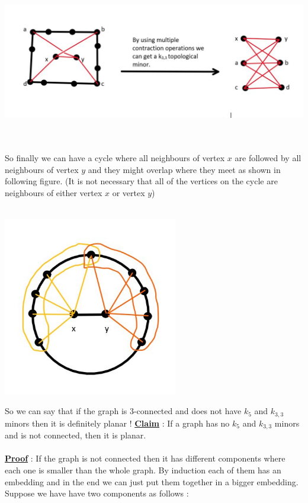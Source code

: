 \documentclass{article}
\begin{document}
    \\\\
    \centerline{\includegraphics[width=6in]{Images/k3,3.jpg}}
    \\\\
    So finally we can have a cycle where all neighbours of vertex $x$ are followed by all neighbours of vertex $y$ and they might overlap where they meet as shown in following figure. (It is not necessary that all of the vertices on the cycle are neighbours of either vertex $x$ or vertex $y$)
    \\\\
    \centerline{\includegraphics[width=3in]{Images/final_lemma_2.JPG}}
    So we can say that if the graph is 3-connected and does not have $k_{5}$ and $k_{3,3}$ minors then it is definitely planar !
    \newpage
    \underline{\textbf{Claim}} : If a graph has no $k_{5}$ and $k_{3,3}$ minors and is not connected, then it is planar. 
    \\\\
    \underline{\textbf{Proof}} : 
    If the graph is not connected then it has different components where each one is smaller than the whole graph. By induction each of them has an embedding and in the end we can just put them together in a bigger embedding. Suppose we have have two components as follows :
\end{document}
